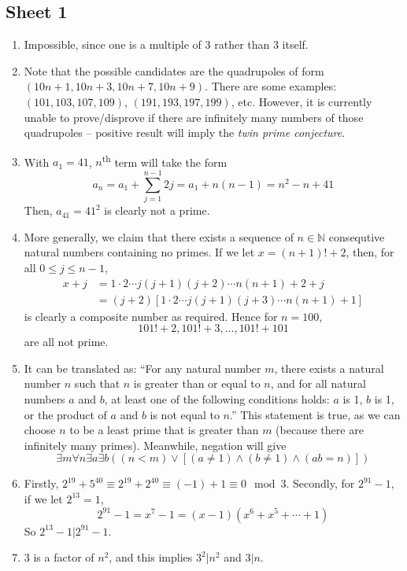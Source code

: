 \documentclass[10pt, a4paper, twoside]{report}
\begin{document}
\subsection{Sheet 1}
\begin{enumerate}[{1.}]
    \item Impossible, since one is a multiple of \(3\) rather than \(3\) itself.
    \item Note that the possible candidates are the quadrupoles of form \newline \((10n+1,10n+3,10n+7,10n+9)\). There are some examples: \((101,103,107,109)\), \((191,193,197,199)\), etc. However, it is currently unable to prove/disprove if there are infinitely many numbers of those quadrupoles -- positive result will imply the \emph{twin prime conjecture}.
    \item With \(a_1=41\), \(n\)\textsuperscript{th} term will take the form 
    \[a_n=a_1+\sum_{j=1}^{n-1}2j=a_1+n(n-1)=n^2-n+41\]
    Then, \(a_{41}=41^2\) is clearly not a prime.
    \item More generally, we claim that there exists a sequence of \(n\in\mathbb{N}\) consequtive natural numbers containing no primes. If we let \(x=(n+1)!+2\), then, for all \(0\leq j\leq n-1\),
    \begin{align*}
        x+j&=1\cdot 2\cdots j(j+1)(j+2)\cdots n(n+1)+2+j \\
        &=(j+2)\left[1\cdot 2\cdots j(j+1)(j+3)\cdots n(n+1)+1\right]
    \end{align*}
    is clearly a composite number as required. Hence for \(n=100\),
    \[101!+2,101!+3,\ldots,101!+101\]
    are all not prime.
    \item It can be translated as: ``For any natural number \(m\), there exists a natural number \(n\) such that \(n\) is greater than or equal to \(n\), and for all natural numbers \(a\) and \(b\), at least one of the following conditions holds: \(a\) is 1, \(b\) is 1, or the product of \(a\) and \(b\) is not equal to \(n\).'' This statement is true, as we can choose \(n\) to be a least prime that is greater than \(m\) (because there are infinitely many primes). Meanwhile, negation will give 
    \[\exists m\forall n\exists a\exists b((n<m)\vee [(a\neq 1)\wedge(b\neq 1)\wedge(ab=n)])\]
    \item Firstly, \(2^{19}+5^{40}\equiv 2^{19}+2^{40}\equiv(-1)+1\equiv 0\mod 3\). Secondly, for \(2^{91}-1\), if we let \(2^{13}=1\),
    \[2^{91}-1=x^7-1=(x-1)(x^6+x^5+\cdots +1)\]
    So \(2^{13}-1\big|2^{91}-1\).
    \item \(3\) is a factor of \(n^2\), and this implies \(3^2|n^2\) and \(3|n\).

\end{enumerate}
\end{document}
